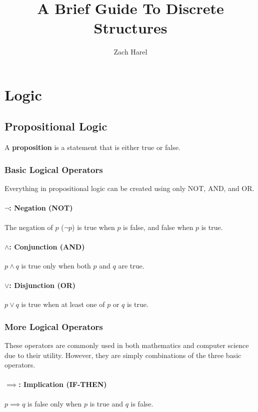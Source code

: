 \documentclass{report}
\title{A Brief Guide To Discrete Structures}
\author{Zach Harel}
\begin{document}
\maketitle

\chapter{Logic}

\section{Propositional Logic}

A \textbf{proposition} is a statement that is either true or false.

\subsection{Basic Logical Operators}

Everything in propositional logic can be created using only NOT, AND, and OR.

\subsubsection{$\neg$: Negation (NOT)}
The negation of $p$ ($\neg p$) is true when $p$ is false, and false when $p$ is true.

\subsubsection{$\land$: Conjunction (AND)}
$p \land q$ is true only when both $p$ and $q$ are true.

\subsubsection{$\lor$: Disjunction (OR)}
$p \lor q$ is true when at least one of $p$ or $q$ is true.

\subsection{More Logical Operators}

These operators are commonly used in both mathematics and computer science due to their utility. However, they are simply combinations of the three basic operators.

\subsubsection{$\implies$: Implication (IF-THEN)}
$p \implies q$ is false only when $p$ is true and $q$ is false.
\end{document}
